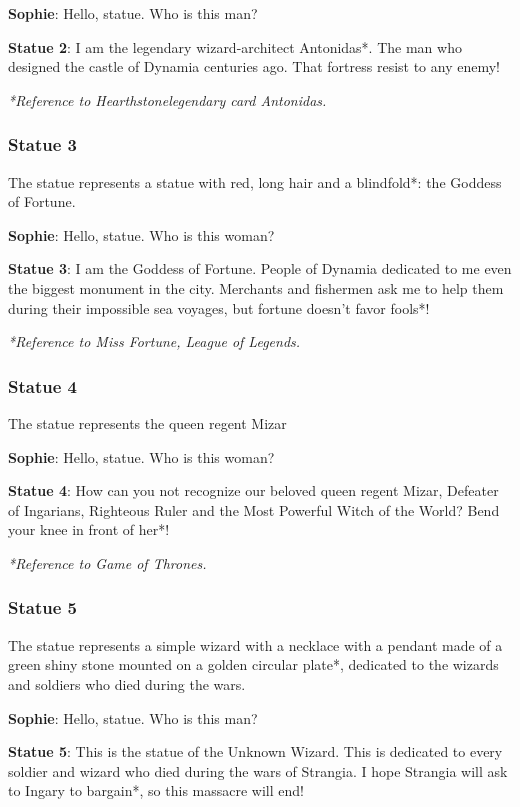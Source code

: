 \textbf{Sophie}: Hello, statue. Who is this man?

\textbf{Statue 2}: I am the legendary wizard-architect Antonidas*. The man who designed the castle of Dynamia centuries ago. That fortress resist to any enemy!


\textit{*Reference to Hearthstone\texttrademark legendary card Antonidas.}

\subsubsection*{Statue 3}
The statue represents a statue with red, long hair and a blindfold*: the Goddess of Fortune.

\textbf{Sophie}: Hello, statue. Who is this woman?

\textbf{Statue 3}: I am the Goddess of Fortune. People of Dynamia dedicated to me even the biggest monument in the city. Merchants and fishermen ask me to help them during their impossible sea voyages, but fortune doesn't favor fools*!

\textit{*Reference to Miss Fortune, League of Legends\texttrademark{}.}

\subsubsection*{Statue 4}
The statue represents the queen regent Mizar

\textbf{Sophie}: Hello, statue. Who is this woman?

\textbf{Statue 4}: How can you not recognize our beloved queen regent Mizar, Defeater of Ingarians, Righteous Ruler and the Most Powerful Witch of the World? Bend your knee in front of her*!

\textit{*Reference to Game of Thrones\texttrademark{}.}

\subsubsection*{Statue 5}
The statue represents a simple wizard with a necklace with a pendant made of a green shiny stone mounted on a golden circular plate*, dedicated to the wizards and soldiers who died during the wars.

\textbf{Sophie}: Hello, statue. Who is this man?

\textbf{Statue 5}: This is the statue of the Unknown Wizard. This is dedicated to every soldier and wizard who died during the wars of Strangia. I hope Strangia will ask to Ingary to bargain*, so this massacre will end!

